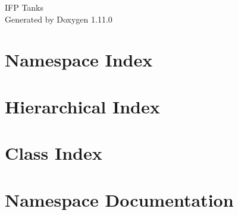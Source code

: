 \documentclass[twoside]{book}
\newcommand{\+}{\discretionary{\mbox{\scriptsize$\hookleftarrow$}}{}{}}
\newcommand{\clearemptydoublepage}{%
    \newpage{\pagestyle{empty}\cleardoublepage}%
  }
\begin{document}
  \raggedbottom
    \hypersetup{pageanchor=false,
                bookmarksnumbered=true,
                pdfencoding=unicode
               }
  \begin{titlepage}
  \vspace*{7cm}
  \begin{center}%
  {\Large IFP Tanks}\\
  \vspace*{1cm}
  {\large Generated by Doxygen 1.11.0}\\
  \end{center}
  \end{titlepage}
  \clearemptydoublepage
  \tableofcontents
  \clearemptydoublepage
  \hypersetup{pageanchor=true}
\chapter{Namespace Index}

\chapter{Hierarchical Index}

\chapter{Class Index}

\chapter{Namespace Documentation}













\end{document}
